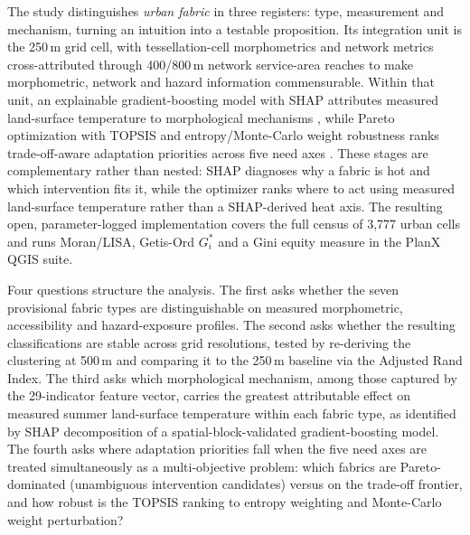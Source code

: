 The study distinguishes \emph{urban fabric} in three registers: type,
measurement and mechanism, turning an intuition into a testable proposition. Its
integration unit is the 250\,m grid cell, with tessellation-cell morphometrics and
network metrics cross-attributed through 400/800\,m network service-area reaches
to make morphometric, network and hazard information commensurable. Within that
unit, an explainable gradient-boosting model with SHAP attributes measured
land-surface temperature to morphological mechanisms
\citep{wangZ2025PlainPlateau, liu2026Nonlinear, li2026BlockGrid}, while Pareto
optimization with TOPSIS and entropy/Monte-Carlo weight robustness ranks
trade-off-aware adaptation priorities across five need axes
\citep{zhang2024MultiObjective, zhu2025SpongeCities}. These stages are
complementary rather than nested: SHAP diagnoses why a fabric is hot and which
intervention fits it, while the optimizer ranks where to act using measured
land-surface temperature rather than a SHAP-derived heat axis. The resulting
open, parameter-logged implementation covers the full census of 3{,}777 urban
cells and runs Moran/LISA, Getis-Ord $G_i^{*}$ and a Gini equity measure in the
PlanX QGIS suite.

Four questions structure the analysis. The first asks whether the seven
provisional fabric types are distinguishable on measured morphometric,
accessibility and hazard-exposure profiles. The second asks whether the
resulting classifications are stable across grid resolutions, tested by
re-deriving the clustering at 500\,m and comparing it to the 250\,m baseline
via the Adjusted Rand Index. The third asks which morphological mechanism,
among those captured by the 29-indicator feature vector, carries the greatest
attributable effect on measured summer land-surface temperature within each
fabric type, as identified by SHAP decomposition of a spatial-block-validated
gradient-boosting model. The fourth asks where adaptation priorities fall when
the five need axes are treated simultaneously as a multi-objective problem:
which fabrics are Pareto-dominated (unambiguous intervention candidates) versus
on the trade-off frontier, and how robust is the TOPSIS ranking to entropy
weighting and Monte-Carlo weight perturbation?

